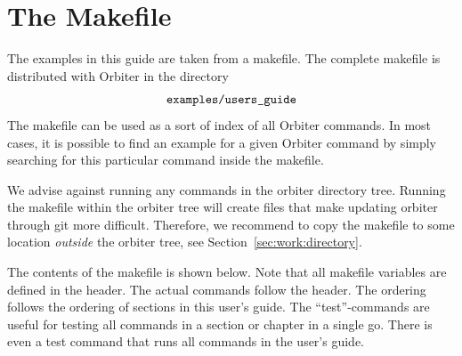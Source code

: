 
\section{The Makefile}
\label{sec:makefile}


The examples in this guide are taken from a makefile. 
The complete makefile is distributed with Orbiter 
in the directory 
$$
\verb'examples/users_guide'
$$
The makefile can be used as a sort of index of all Orbiter commands. 
In most cases, it is possible to find an example 
for a given Orbiter command by simply searching for this particular command inside the makefile.

\bigskip

We advise against running any commands in the orbiter directory tree. 
Running the makefile within the orbiter tree will create files that make updating orbiter through git more difficult.
Therefore, we recommend to copy the makefile to some location {\em outside} 
the orbiter tree, see Section~\ref{sec:work:directory}.

\bigskip


The contents of the makefile is shown below.
Note that all makefile variables are defined in the header. The actual commands follow the header. 
The ordering follows the ordering of sections in this user's guide. 
The ``test''-commands are useful for testing all commands in a section or chapter in a single go. 
There is even a test command that runs all commands in the user's guide. 


\bigskip







\bigskip

\clearpage

